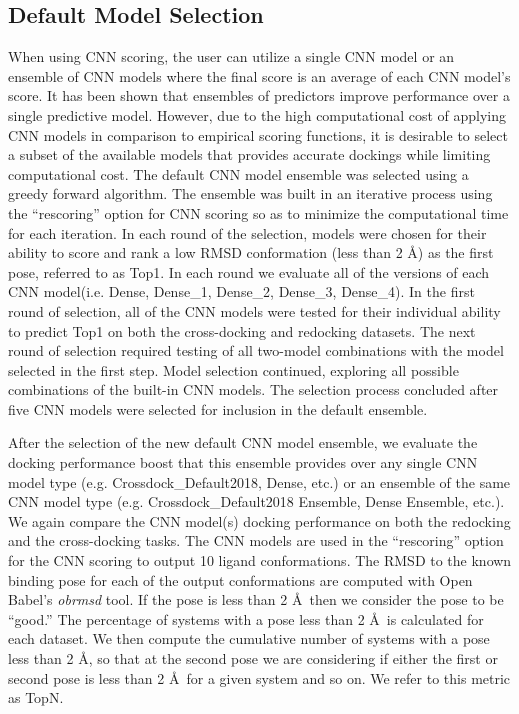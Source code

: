 \documentclass[journal=jcisd8,manuscript=article]{achemso}
\begin{document}
\subsection{Default Model Selection}
When using CNN scoring, the user can utilize a single CNN model or an ensemble of CNN models where the final score is an average of each CNN model's score. It has been shown that ensembles of predictors improve performance over a single predictive model\cite{dietterich2000ensemble}. However, due to the high computational cost of applying CNN models in comparison to empirical scoring functions, it is desirable to select a subset of the available models that provides accurate dockings while limiting computational cost. The default CNN model ensemble was selected using a greedy forward algorithm. The ensemble was built in an iterative process using the ``rescoring'' option for CNN scoring so as to minimize the computational time for each iteration. In each round of the selection, models were chosen for their ability to score and rank a low RMSD conformation (less than 2 \AA) as the first pose, referred to as Top1. In each round we evaluate all of the versions of each CNN model(i.e. Dense, Dense\_1, Dense\_2, Dense\_3, Dense\_4). In the first round of selection, all of the CNN models were tested for their individual ability to predict Top1 on both the cross-docking and redocking datasets. The next round of selection required testing of all two-model combinations with the model selected in the first step. Model selection continued, exploring all possible combinations of the built-in CNN models. The selection process concluded after five CNN models were selected for inclusion in the default ensemble.

After the selection of the new default CNN model ensemble, we evaluate the docking performance boost that this ensemble provides over any single CNN model type (e.g. Crossdock\_Default2018, Dense, etc.) or an ensemble of the same CNN model type (e.g. Crossdock\_Default2018 Ensemble, Dense Ensemble, etc.). We again compare the CNN model(s) docking performance on both the redocking and the cross-docking tasks. The CNN models are used in the ``rescoring'' option for the CNN scoring to output 10 ligand conformations. The RMSD to the known binding pose for each of the output conformations are computed with Open Babel's \textit{obrmsd} tool. If the pose is less than 2 \AA~then we consider the pose to be ``good.'' The percentage of systems with a pose less than 2 \AA~is calculated for each dataset. We then compute the cumulative number of systems with a pose less than 2 \AA, so that at the second pose we are considering if either the first or second pose is less than 2 \AA~for a given system and so on. We refer to this metric as TopN.
\end{document}

